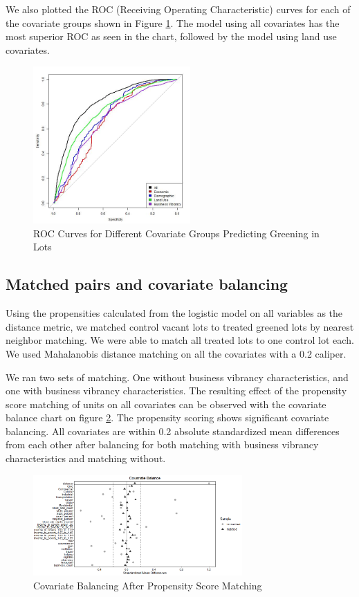 \documentclass{article}
\begin{document}
We also plotted the ROC (Receiving Operating Characteristic) curves for each of the covariate groups shown in Figure \ref{fig:figure10}. The model using all covariates has the most superior ROC as seen in the chart, followed by the model using land use covariates. 

\begin{figure}[h]
    \includegraphics[width=6cm]{imgs/rocs.jpg}
    \centering
    \caption{ROC Curves for Different Covariate Groups Predicting Greening in Lots}
    \label{fig:figure10}
\end{figure}


\subsection{Matched pairs and covariate balancing}
Using the propensities calculated from the logistic model on all variables as the distance metric, we matched control vacant lots to treated greened lots by nearest neighbor matching. We were able to match all treated lots to one control lot each. We used Mahalanobis distance matching on all the covariates with a 0.2 caliper. 

We ran two sets of matching. One without business vibrancy characteristics, and one with business vibrancy characteristics. The resulting effect of the propensity score matching of units on all covariates can be observed with the covariate balance chart on figure \ref{fig:a}. The propensity scoring shows significant covariate balancing. All covariates are within 0.2 absolute standardized mean differences from each other after balancing for both matching with business vibrancy characteristics and matching without.

 \begin{figure}[h]
    \includegraphics[width=8cm]{imgs/propensity_balance.png}
    \centering
    \caption{\label{fig:a}Covariate Balancing After Propensity Score Matching}
\end{figure}
\end{document}
